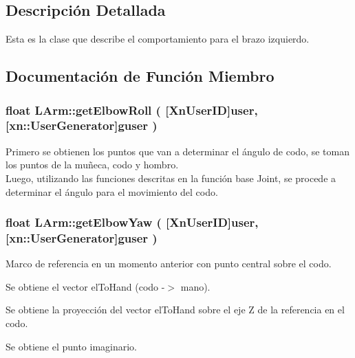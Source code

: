 \subsection{\-Descripción \-Detallada}
\-Esta es la clase que describe el comportamiento para el brazo izquierdo. 

\subsection{\-Documentación de \-Función \-Miembro}
\hypertarget{class_l_arm_aca3aa8c68dedd1c7fb1e0ed9ba55b239}{
\subsubsection[{get\-Elbow\-Roll}]{\setlength{\rightskip}{0pt plus 5cm}float {\bf \-L\-Arm\-::get\-Elbow\-Roll} (
[{\-Xn\-User\-I\-D}]{user, }
[{xn\-::\-User\-Generator}]{guser}
)}}\label{class_l_arm_aca3aa8c68dedd1c7fb1e0ed9ba55b239}


\-Primero se obtienen los puntos que van a determinar el ángulo de codo, se toman los puntos de la muñeca, codo y hombro.\\
\-Luego, utilizando las funciones descritas en la función base Joint, se procede a determinar el ángulo para el movimiento del codo. 


 \hypertarget{class_l_arm_a45c25b7614431e4a3e39bfcf977a3de7}{
\subsubsection[{get\-Elbow\-Yaw}]{\setlength{\rightskip}{0pt plus 5cm}float {\bf \-L\-Arm\-::get\-Elbow\-Yaw} (
[{\-Xn\-User\-I\-D}]{user, }
[{xn\-::\-User\-Generator}]{guser}
)}}\label{class_l_arm_a45c25b7614431e4a3e39bfcf977a3de7}
\-Marco de referencia en un momento anterior con punto central sobre el codo.

\-Se obtiene el vector el\-To\-Hand (codo -\/$>$ mano).

\-Se obtiene la proyección del vector el\-To\-Hand sobre el eje \-Z de la referencia en el codo.

\-Se obtiene el punto imaginario.

